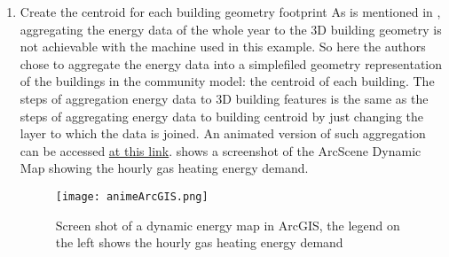 \begin{enumerate}[1)]
\item Create the centroid for each building geometry footprint As is
  mentioned in , aggregating the energy data
  of the whole year to the 3D building geometry is not achievable with
  the machine used in this example. So here the authors chose to
  aggregate the energy data into a simplefiled geometry representation
  of the buildings in the community model: the centroid of each
  building. The steps of aggregation energy data to 3D building
  features is the same as the steps of aggregating energy data to
  building centroid by just changing the layer to which the data is
  joined. An animated version of such aggregation can be accessed
  \href{http://www.armechxyj.com/energy-mapping.html#arcgisAnime}{at
    this link}.  shows a screenshot of the
  ArcScene Dynamic Map showing the hourly gas heating energy demand. 

\begin{figure}[h!]
  \centering
  \texttt{[image: animeArcGIS.png]}
  \caption[3D Dynamic Heat Map in ArcGIS]{Screen shot of a dynamic
    energy map in ArcGIS, the legend on the left shows the hourly gas
    heating energy demand}
  \label{fig:animeArcGIS}
\end{figure}

\end{enumerate}



